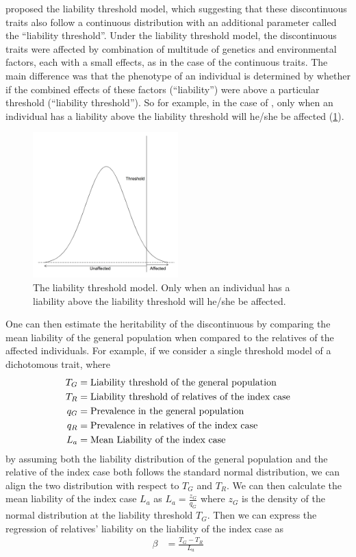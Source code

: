 	\citet{Falconer1965} proposed the liability threshold model, which suggesting that these discontinuous traits also follow a continuous distribution with an additional parameter called the ``liability threshold''.
	Under the liability threshold model, the discontinuous traits were affected by combination of multitude of genetics and environmental factors, each with a small effects, as in the case of the continuous traits.
	The main difference was that the phenotype of an individual is determined by whether if the combined effects of these factors (``liability'') were above a particular threshold (``liability threshold'').
	So for example, in the case of , only when an individual has a liability above the liability threshold will he/she be affected (\cref{fig:liability}).
	\begin{figure}
		\centering
		\includegraphics[width=0.5\textwidth]{figure/liability.png}
		\caption[Liability Threshold Model]{
			The liability threshold model.
			Only when an individual has a liability above the liability threshold will he/she be affected.
			}
			\label{fig:liability}
	\end{figure}
	One can then estimate the heritability of the discontinuous by comparing the mean liability of the general population when compared to the relatives of the affected individuals.	
	For example, if we consider a single threshold model of a dichotomous trait, where 
	\begin{align}
	T_G &= \text{Liability threshold of the general population}\notag\\
	T_R &= \text{Liability threshold of relatives of the index case} \notag\\
	q_G &= \text{Prevalence in the general population}\notag\\
	q_R &= \text{Prevalence in relatives of the index case}\notag\\
	L_a &= \text{Mean Liability of the index case} \notag
	\end{align}
	by assuming both the liability distribution of the general population and the relative of the index case both follows the standard normal distribution, we can align the two distribution with respect to $T_G$ and $T_R$. 
	We can then calculate the mean liability of the index case $L_a$ as $L_a=\frac{z_G}{q_G}$ where $z_G$ is the density of the normal distribution at the liability threshold $T_G$.
	Then we can express the regression of relatives' liability on the liability of the index case as
	\begin{align}
	\beta &= \frac{T_G-T_R}{L_a}
	\label{eq:liability}
	\end{align}
	
